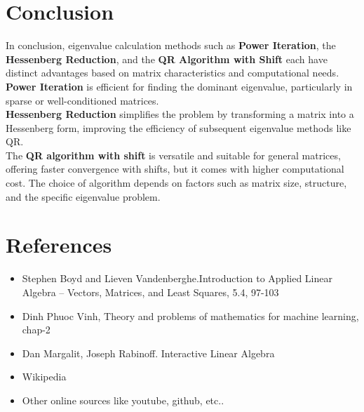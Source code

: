 \documentclass[12pt]{article}
\begin{document}
\section{Conclusion}
In conclusion, eigenvalue calculation methods such as \textbf{Power Iteration}, the \textbf{Hessenberg Reduction}, and the \textbf{QR Algorithm with Shift} each have distinct advantages based on matrix characteristics and computational needs.\\
\textbf{Power Iteration} is efficient for finding the dominant eigenvalue, particularly in sparse or well-conditioned matrices.\\ 
\textbf{Hessenberg Reduction} simplifies the problem by transforming a matrix into a Hessenberg form, improving the efficiency of subsequent eigenvalue methods like QR.\\ 
The \textbf{QR algorithm with shift} is versatile and suitable for general matrices, offering faster convergence with shifts, but it comes with higher computational cost. The choice of algorithm depends on factors such as matrix size, structure, and the specific eigenvalue problem.

\section{References}
\begin{itemize}
    \item Stephen Boyd and Lieven Vandenberghe.Introduction to Applied Linear Algebra – Vectors, Matrices, and Least Squares, 5.4, 97-103
    \item Dinh Phuoc Vinh, Theory and problems of mathematics for machine learning, chap-2
    \item Dan Margalit, Joseph Rabinoff. Interactive Linear Algebra
    \item Wikipedia
    \item Other online sources like youtube, github, etc..
\end{itemize}

\end{document}
